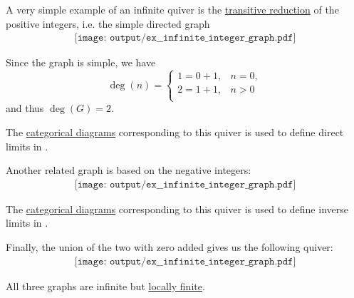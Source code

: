 \begin{example}\label{ex:infinite_integer_graphs}
  A very simple example of an infinite quiver is the \hyperref[def:relation_closures/transitive]{transitive reduction} of the positive integers, i.e. the simple directed graph
  \begin{equation}\label{eq:ex:infinite_integer_graphs/positive}
    \begin{aligned}
      \texttt{[image: output/ex\_\_infinite\_integer\_graph.pdf]}
    \end{aligned}
  \end{equation}

  Since the graph is simple, we have
  \begin{equation*}
    \deg(n) = \begin{cases}
      1 = 0 + 1, &n = 0, \\
      2 = 1 + 1, &n > 0 \\
    \end{cases}
  \end{equation*}
  and thus \( \deg(G) = 2 \).

  The \hyperref[def:categorical_diagram]{categorical diagrams} corresponding to this quiver is used to define direct limits in .

  Another related graph is based on the negative integers:
  \begin{equation}\label{eq:ex:infinite_integer_graphs/negative}
    \begin{aligned}
      \texttt{[image: output/ex\_\_infinite\_integer\_graph.pdf]}
    \end{aligned}
  \end{equation}

  The \hyperref[def:categorical_diagram]{categorical diagrams} corresponding to this quiver is used to define inverse limits in .

  Finally, the union of the two with zero added gives us the following quiver:
  \begin{equation}\label{eq:ex:infinite_integer_graphs/two_sided}
    \begin{aligned}
      \texttt{[image: output/ex\_\_infinite\_integer\_graph.pdf]}
    \end{aligned}
  \end{equation}

  All three graphs are infinite but \hyperref[def:hypergraph/degree]{locally finite}.
\end{example}

